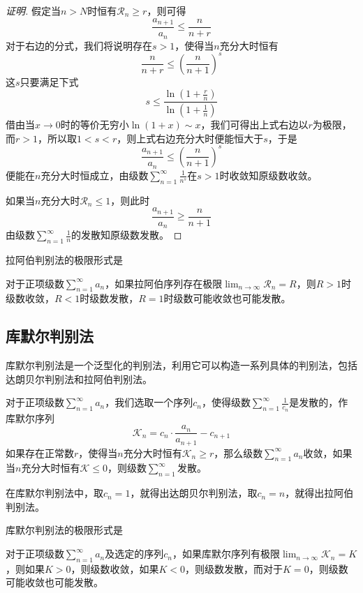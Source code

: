 \begin{proof}[证明]
  假定当$n>N$时恒有$\mathcal{R}_n \geqslant r$，则可得
  \[ \frac{a_{n+1}}{a_n} \leqslant \frac{n}{n+r} \]
  对于右边的分式，我们将说明存在$s>1$，使得当$n$充分大时恒有
  \[ \frac{n}{n+r} \leqslant \left( \frac{n}{n+1} \right)^s \]
  这$s$只要满足下式
  \[ s \leqslant \frac{\ln{\left( 1+\frac{r}{n} \right)}}{\ln{\left( 1+\frac{1}{n} \right)}} \]
  借由当$x \to 0$时的等价无穷小$\ln(1+x) \sim x$，我们可得出上式右边以$r$为极限，而$r>1$，所以取$1<s<r$，则上式右边充分大时便能恒大于$s$，于是
  \[ \frac{a_{n+1}}{a_n} \leqslant \left( \frac{n}{n+1} \right)^s \]
  便能在$n$充分大时恒成立，由级数$\sum_{n=1}^{\infty}\frac{1}{n^s}$在$s>1$时收敛知原级数收敛。

  如果当$n$充分大时$\mathcal{R}_n \leqslant 1$，则此时
  \[ \frac{a_{n+1}}{a_n} \geqslant \frac{n}{n+1} \]
  由级数$\sum_{n=1}^{\infty}\frac{1}{n}$的发散知原级数发散。
\end{proof}

拉阿伯判别法的极限形式是
\begin{inference}
  对于正项级数$\sum_{n=1}^{\infty}a_n$，如果拉阿伯序列存在极限$\lim_{n \to \infty} \mathcal{R}_n=R$，则$R>1$时级数收敛，$R<1$时级数发散，$R=1$时级数可能收敛也可能发散。
\end{inference}

\subsection{库默尔判别法}
\label{sec:kummer-method-about-series-converage}

库默尔判别法是一个泛型化的判别法，利用它可以构造一系列具体的判别法，包括达朗贝尔判别法和拉阿伯判别法。

\begin{theorem}
  对于正项级数$\sum_{n=1}^{\infty}a_n$，我们选取一个序列$c_n$，使得级数$\sum_{n=1}^{\infty}\frac{1}{c_n}$是发散的，作库默尔序列
  \[ \mathcal{K}_n = c_n \cdot \frac{a_n}{a_{n+1}} - c_{n+1} \]
  如果存在正常数$r$，使得当$n$充分大时恒有$\mathcal{K}_n \geqslant r$，那么级数$\sum_{n=1}^{\infty}a_n$收敛，如果当$n$充分大时恒有$\mathcal{K} \leqslant 0$，则级数$\sum_{n=1}^{\infty}$发散。
\end{theorem}

在库默尔判别法中，取$c_n=1$，就得出达朗贝尔判别法，取$c_n=n$，就得出拉阿伯判别法。

库默尔判别法的极限形式是
\begin{theorem}
  对于正项级数$\sum_{n=1}^{\infty}a_n$及选定的序列$c_n$，如果库默尔序列有极限$\lim_{n \to \infty} \mathcal{K}_n=K$，则如果$K>0$，则级数收敛，如果$K<0$，则级数发散，而对于$K=0$，则级数可能收敛也可能发散。
\end{theorem}


